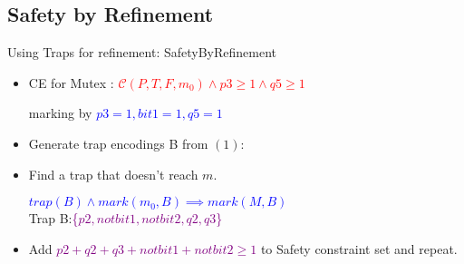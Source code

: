 \documentclass{beamer}
\begin{document}
\subsection{Safety by Refinement}
\begin{frame}{Using Traps for refinement: SafetyByRefinement}
  
  \begin{itemize}
  \item<1-> {
  CE for Mutex : \textcolor{red}{$\mathcal{C}(P,T,F,m_0)\land p3 \geq 1 \land q5 \geq 1 $} 
  \begin{center}
  marking by \textcolor{blue}{$p3=1,bit1=1,q5=1$}
  \end{center}
  }
  \item<2-> {   
Generate trap encodings B from $(1)$:
  }
  \item<3-> {
    Find a trap that doesn't reach $m$.\\
    \begin{center}
    \textcolor{blue}{$trap(B) \land mark(m_0,B) \implies mark(M,B)$}\\
    Trap B:\textcolor{purple}{\{$p2,notbit1,notbit2,q2,q3$\}}
    \end{center}

  }
  \item<5-> { Add \textcolor{purple}{$p2+q2+q3+notbit1+notbit2 \geq 1$} to Safety constraint set and repeat.}
 
  \end{itemize}
\end{frame}
\end{document}

